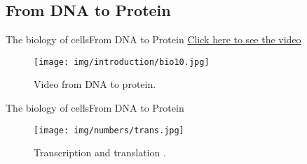 \documentclass[10pt]{beamer}
\newcommand{\1}{
	\setbeamertemplate{background}{
		\texttt{[image: img/1]}
		\tikz[overlay] \fill[fill opacity=0.75,fill=white] (0,0) rectangle (-\paperwidth,\paperheight);
	}
}
\begin{document}
\subsection{From DNA to Protein}

\begin{frame}{The biology of cells}{From DNA to Protein}
\href{https://www.youtube.com/watch?v=gG7uCskUOrA}{Click here to see the video} \\
\begin{figure}[]
 \centering
    \texttt{[image: img/introduction/bio10.jpg]}
    \label{img:mot2}
    \caption{Video from DNA to protein.}
\end{figure}
\end{frame}


\begin{frame}{The biology of cells}{From DNA to Protein}
\begin{figure}[]
	\centering
	\texttt{[image: img/numbers/trans.jpg]}
	\label{img:mot2}
	\caption{Transcription and translation \cite{nci2020}.}
\end{figure}
\end{frame}
\end{document}
